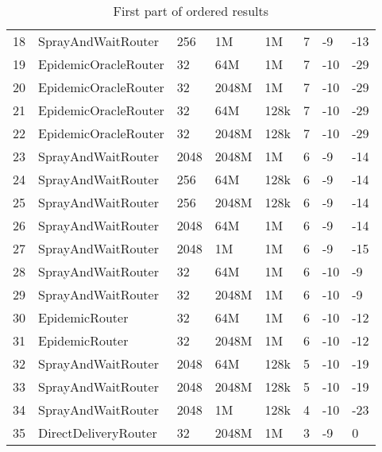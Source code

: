 \begin{table}[htpb]
\begin{tabular}{@{}p{}p{}p{}p{}p{}p{}p{}p{}@{}}
18 & SprayAndWaitRouter & 256 & 1M & 1M & 7 & -9 & -13 \\
19 & EpidemicOracleRouter & 32 & 64M & 1M & 7 & -10 & -29 \\
20 & EpidemicOracleRouter & 32 & 2048M & 1M & 7 & -10 & -29 \\
21 & EpidemicOracleRouter & 32 & 64M & 128k & 7 & -10 & -29 \\
22 & EpidemicOracleRouter & 32 & 2048M & 128k & 7 & -10 & -29 \\
23 & SprayAndWaitRouter & 2048 & 2048M & 1M & 6 & -9 & -14 \\
24 & SprayAndWaitRouter & 256 & 64M & 128k & 6 & -9 & -14 \\
25 & SprayAndWaitRouter & 256 & 2048M & 128k & 6 & -9 & -14 \\
26 & SprayAndWaitRouter & 2048 & 64M & 1M & 6 & -9 & -14 \\
27 & SprayAndWaitRouter & 2048 & 1M & 1M & 6 & -9 & -15 \\
28 & SprayAndWaitRouter & 32 & 64M & 1M & 6 & -10 & -9 \\
29 & SprayAndWaitRouter & 32 & 2048M & 1M & 6 & -10 & -9 \\
30 & EpidemicRouter & 32 & 64M & 1M & 6 & -10 & -12 \\
31 & EpidemicRouter & 32 & 2048M & 1M & 6 & -10 & -12 \\
32 & SprayAndWaitRouter & 2048 & 64M & 128k & 5 & -10 & -19 \\
33 & SprayAndWaitRouter & 2048 & 2048M & 128k & 5 & -10 & -19 \\
34 & SprayAndWaitRouter & 2048 & 1M & 128k & 4 & -10 & -23 \\
35 & DirectDeliveryRouter & 32 & 2048M & 1M & 3 & -9 & 0 \\ \bottomrule
\end{tabular}
\caption{First part of ordered results}
\label{tab:res1}
\end{table}

